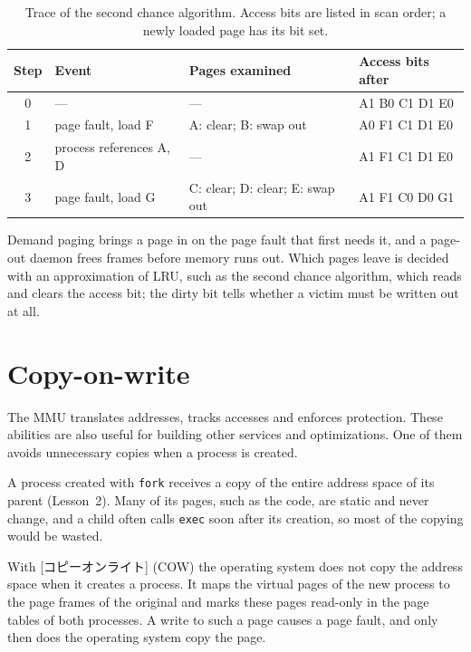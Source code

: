 \documentclass[../main.tex]{subfiles}
\begin{document}
\begin{table}[htbp]
  \centering
  \caption{Trace of the second chance algorithm.  Access bits are listed in
    scan order; a newly loaded page has its bit set.}
  \label{tab:l08-second-chance}
  \small
  \begin{tabular}{@{}clll@{}}
    \toprule
    Step & Event & Pages examined & Access bits after \\
    \midrule
    0 & ---                     & ---                          & A1 B0 C1 D1 E0 \\
    1 & page fault, load F      & A: clear; B: swap out        & A0 F1 C1 D1 E0 \\
    2 & process references A, D & ---                          & A1 F1 C1 D1 E0 \\
    3 & page fault, load G      & C: clear; D: clear; E: swap out & A1 F1 C0 D0 G1 \\
    \bottomrule
  \end{tabular}
\end{table}

\begin{keypoint}
  Demand paging brings a page in on the page fault that first needs it, and
  a page-out daemon frees frames before memory runs out.  Which pages leave
  is decided with an approximation of LRU, such as the second chance
  algorithm, which reads and clears the access bit; the dirty bit tells
  whether a victim must be written out at all.
\end{keypoint}

\section{Copy-on-write}
\label{sec:l08-cow}

The MMU translates addresses, tracks accesses and enforces protection.
These abilities are also useful for building other services and
optimizations.  One of them avoids unnecessary copies when a process is
created.

A process created with \texttt{fork} receives a copy of the
entire address space of its parent (Lesson~2).  Many of its pages, such as
the code, are static and never change, and a child often calls
\texttt{exec} soon after its creation, so most of the copying would be
wasted.

\begin{definition}
  With [コピーオンライト]
  (COW) the operating system does not copy the address space when it
  creates a process.  It maps the virtual pages of the new process to the
  page frames of the original and marks these pages read-only in the page
  tables of both processes.  A write to such a page causes a page fault, and only then does
  the operating system copy the page.
\end{definition}
\end{document}
